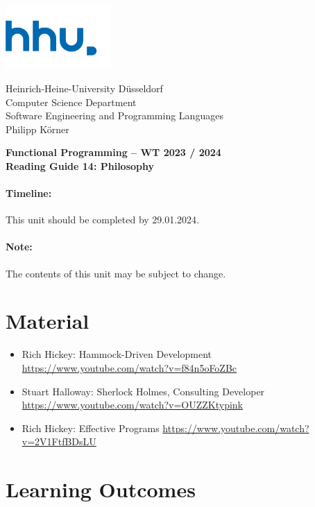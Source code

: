 \documentclass[11pt,a4paper]{article}
\begin{document}
\begin{minipage}[b]{\textwidth}
	\parbox[t]{5cm}{%
		\includegraphics[width=4cm]{unilogo}
		\hfill
	}
	\parbox[b]{11cm}{%
		Heinrich-Heine-University D\"usseldorf\\
		Computer Science Department\\
		Software Engineering and Programming Languages\\
		Philipp K\"orner
	}
\end{minipage}
\begin{center}
	\bf
	Functional Programming -- WT 2023 / 2024\\
	Reading Guide 14: Philosophy
\end{center}

\pagestyle{empty}

\paragraph{Timeline:} This unit should be completed by 29.01.2024.

\paragraph{Note:} The contents of this unit may be subject to change.

\section{Material} 

\begin{itemize}
\item Rich Hickey: Hammock-Driven Development \url{https://www.youtube.com/watch?v=f84n5oFoZBc}
\item Stuart Halloway: Sherlock Holmes, Consulting Developer \url{https://www.youtube.com/watch?v=OUZZKtypink}
\item Rich Hickey: Effective Programs \url{https://www.youtube.com/watch?v=2V1FtfBDsLU}
\end{itemize}


\section{Learning Outcomes}
\end{document}
